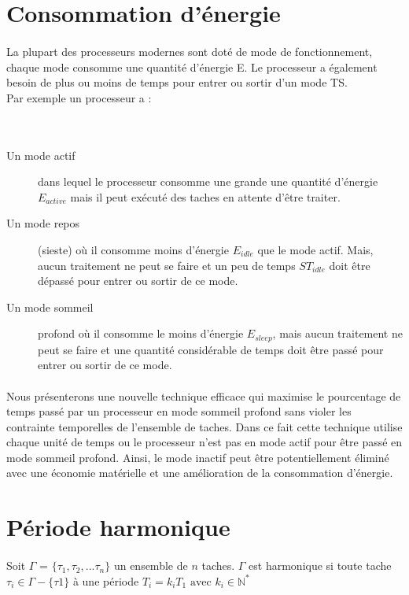 \documentclass[french]{book}
\begin{document}
\section{Consommation d'énergie}
\paragraph{}
La plupart des processeurs modernes sont doté de mode de fonctionnement, chaque mode consomme une quantité d’énergie E. Le processeur a également besoin de plus ou moins de temps pour entrer ou sortir d’un mode TS.\\
Par exemple un processeur a : 
\\
\\
\\
\begin{description}
\item[Un mode actif] dans lequel le processeur consomme une grande une quantité d’énergie $E_{active}$ mais il peut exécuté des taches en attente d’être traiter.
\item[Un mode repos] (sieste) où il consomme moins d’énergie $E_{idle}$ que le mode actif. Mais, aucun traitement ne peut se faire et un peu de temps $ST_{idle}$ doit être dépassé pour entrer ou sortir de ce mode.
\item[Un mode sommeil] profond où il consomme le moins d’énergie $E_{sleep}$, mais aucun traitement ne peut se faire et une quantité considérable de temps doit être passé pour entrer ou sortir de ce mode.
\end{description}
\paragraph{}
Nous présenterons une nouvelle technique efficace qui maximise le pourcentage de temps passé par un processeur en mode sommeil profond sans violer les contrainte temporelles de l’ensemble de taches. Dans ce fait cette technique utilise chaque unité de temps ou le processeur n’est pas en mode actif pour être passé en mode sommeil profond. Ainsi, le mode inactif peut être potentiellement éliminé avec une économie matérielle et une amélioration de la consommation d’énergie.
\section{Période harmonique}
\paragraph{}
Soit $\Gamma$ = $\{\tau_{1},\tau_{2},. . . \tau_{n}\}$ un ensemble de $n$ taches. $\Gamma$ est harmonique si toute tache $\tau_{i} \in \Gamma - \{\tau{1}\} $ à une période $T_{i} = k_{i}T_{1} \text{ avec } k_{i} \in \mathbb{N}^*$ 
\end{document}
